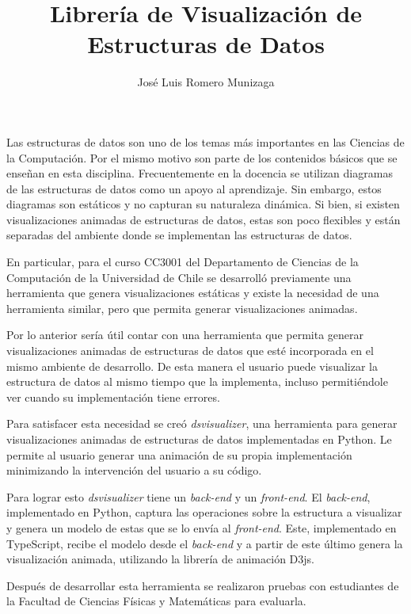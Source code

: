 \documentclass{umemoria}
\author{José Luis Romero Munizaga}
\title{Librería de Visualización de Estructuras de Datos}
\begin{document}
\frontmatter
\maketitle

\begin{resumen}
Las estructuras de datos son uno de los temas más importantes en las Ciencias de la Computación.
Por el mismo motivo son parte de los contenidos básicos que se enseñan en esta disciplina.
Frecuentemente en la docencia se utilizan diagramas de las estructuras de datos como un apoyo al aprendizaje.
Sin embargo, estos diagramas son estáticos y no capturan su naturaleza dinámica.
Si bien, si existen visualizaciones animadas de estructuras de datos, estas son poco flexibles y están separadas del ambiente donde se implementan las estructuras de datos.

En particular, para el curso CC3001 del Departamento de Ciencias de la Computación de la Universidad de Chile se desarrolló previamente una herramienta que genera visualizaciones estáticas y existe la necesidad de una herramienta similar, pero que permita generar visualizaciones animadas.

Por lo anterior sería útil contar con una herramienta que permita generar visualizaciones animadas de estructuras de datos que esté incorporada en el mismo ambiente de desarrollo.
De esta manera el usuario puede visualizar la estructura de datos al mismo tiempo que la implementa, incluso permitiéndole ver cuando su implementación tiene errores.

Para satisfacer esta necesidad se creó \textit{dsvisualizer}, una herramienta para generar visualizaciones animadas de estructuras de datos implementadas en Python.
Le permite al usuario generar una animación de su propia implementación minimizando la intervención del usuario a su código.

Para lograr esto \textit{dsvisualizer} tiene un \textit{back-end} y un \textit{front-end}. El \textit{back-end}, implementado en Python, captura las operaciones sobre la estructura a visualizar y genera un modelo de estas que se lo envía al \textit{front-end}. Este, implementado en TypeScript, recibe el modelo desde el \textit{back-end} y a partir de este último genera la visualización animada, utilizando la librería de animación D3js.

Después de desarrollar esta herramienta se realizaron pruebas con estudiantes de la Facultad de Ciencias Físicas y Matemáticas para evaluarla.
\end{resumen}
\end{document}
